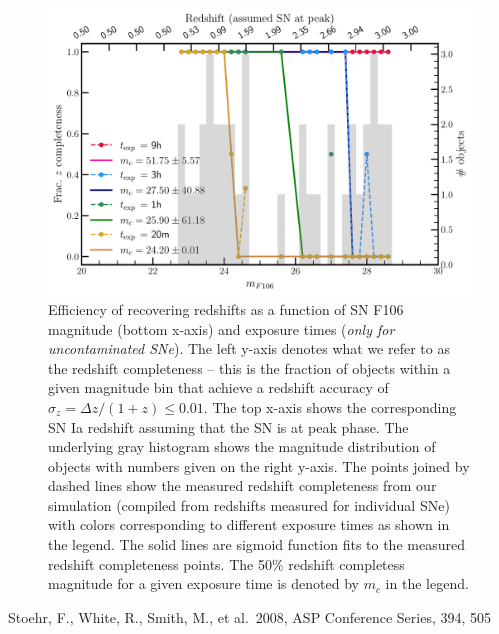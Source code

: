 \documentclass[12pt]{article}
\begin{document}
\begin{figure}
\includegraphics[width=\textwidth]{pylinearrecovery_completeness.pdf}
\caption{Efficiency of recovering redshifts as a function of SN F106 magnitude (bottom x-axis) and exposure times (\textit{only for uncontaminated SNe}). The left y-axis denotes what we refer to as the redshift completeness -- this is the fraction of objects within a given magnitude bin that achieve a redshift accuracy of $\sigma_z = \Delta z/(1+z) \leq 0.01$. The top x-axis shows the corresponding SN Ia redshift assuming that the SN is at peak phase. The underlying gray histogram shows the magnitude distribution of objects with numbers given on the right y-axis. The points joined by dashed lines show the measured redshift completeness from our simulation (compiled from redshifts measured for individual SNe) with colors corresponding to different exposure times as shown in the legend. The solid lines are sigmoid function fits to the measured redshift completeness points. The 50\% redshift completess magnitude for a given exposure time is denoted by $m_c$ in the legend.}
\label{fig:redshift_completeness}
\end{figure}

\begin{thebibliography}{}
 Stoehr, F., White, R., Smith, M., et al.\ 2008, ASP Conference Series, 394, 505
\end{thebibliography}
\end{document}
